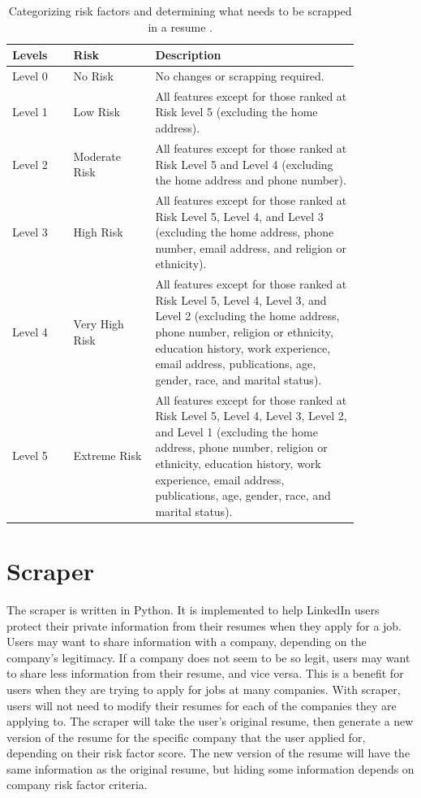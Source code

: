 \documentclass{article}
\begin{document}
\begin{table}[h]
    \centering
    \begin{tabular}{|p{0.15\linewidth}|p{0.2\linewidth}|p{0.5\linewidth}|}
        \hline
        \textbf{Levels} & \textbf{Risk} & \textbf{Description}\\
        \hline
        Level 0 & No Risk & No changes or scrapping required.\\
        \hline
        Level 1 & Low Risk & All features except for those ranked at Risk level 5 (excluding the home address).\\
        \hline
        Level 2 & Moderate Risk & All features except for those ranked at Risk Level 5 and Level 4 (excluding the home address and phone number).\\
        \hline
        Level 3 & High Risk & All features except for those ranked at Risk Level 5, Level 4, and Level 3 (excluding the home address, phone number, email address, and religion or ethnicity).\\
        \hline
        Level 4 & Very High Risk & All features except for those ranked at Risk Level 5, Level 4, Level 3, and Level 2 (excluding the home address, phone number, religion or ethnicity, education history, work experience, email address, publications, age, gender, race, and marital status).\\
        \hline
        Level 5 & Extreme Risk & All features except for those ranked at Risk Level 5, Level 4, Level 3, Level 2, and Level 1 (excluding the home address, phone number, religion or ethnicity, education history, work experience, email address, publications, age, gender, race, and marital status).\\
        \hline
    \end{tabular}
    \caption{\label{demo-table_02} Categorizing risk factors and determining what needs to be scrapped in a resume .}
\end{table}


\section{Scraper}
The scraper is written in Python. It is implemented to help LinkedIn users protect their private information from their resumes when they apply for a job. Users may want to share information with a company, depending on the company's legitimacy. If a company does not seem to be so legit, users may want to share less information from their resume, and vice versa. This is a benefit for users when they are trying to apply for jobs at many companies. With scraper, users will not need to modify their resumes for each of the companies they are applying to. The scraper will take the user's original resume, then generate a new version of the resume for the specific company that the user applied for, depending on their risk factor score. The new version of the resume will have the same information as the original resume, but hiding some information depends on company risk factor criteria.
 
\end{document}
